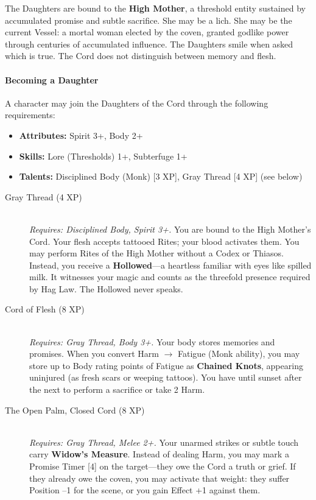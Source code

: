 The Daughters are bound to the \textbf{High Mother}, a threshold entity sustained by accumulated promise and subtle sacrifice. She may be a lich. She may be the current Vessel: a mortal woman elected by the coven, granted godlike power through centuries of accumulated influence. The Daughters smile when asked which is true. The Cord does not distinguish between memory and flesh.

\paragraph{Becoming a Daughter}
A character may join the Daughters of the Cord through the following requirements:
\begin{itemize}
    \item \textbf{Attributes:} Spirit 3+, Body 2+
    \item \textbf{Skills:} Lore (Thresholds) 1+, Subterfuge 1+
    \item \textbf{Talents:} Disciplined Body (Monk) [3 XP], Gray Thread [4 XP] (see below)
\end{itemize}

\begin{description}
    \item[Gray Thread (4 XP)] \hfill \\
    \textit{Requires: Disciplined Body, Spirit 3+.} You are bound to the High Mother's Cord. Your flesh accepts tattooed Rites; your blood activates them. You may perform Rites of the High Mother without a Codex or Thiasos. Instead, you receive a \textbf{Hollowed}---a heartless familiar with eyes like spilled milk. It witnesses your magic and counts as the threefold presence required by Hag Law. The Hollowed never speaks.

    \item[Cord of Flesh (8 XP)] \hfill \\
    \textit{Requires: Gray Thread, Body 3+.} Your body stores memories and promises. When you convert Harm $\rightarrow$ Fatigue (Monk ability), you may store up to Body rating points of Fatigue as \textbf{Chained Knots}, appearing uninjured (as fresh scars or weeping tattoos). You have until sunset after the next to perform a sacrifice or take 2 Harm.

    \item[The Open Palm, Closed Cord (8 XP)] \hfill \\
    \textit{Requires: Gray Thread, Melee 2+.} Your unarmed strikes or subtle touch carry \textbf{Widow's Measure}. Instead of dealing Harm, you may mark a Promise Timer [4] on the target---they owe the Cord a truth or grief. If they already owe the coven, you may activate that weight: they suffer Position --1 for the scene, or you gain Effect +1 against them.
\end{description}


